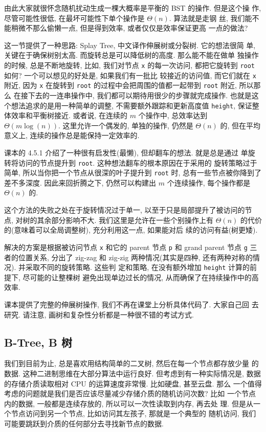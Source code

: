 \documentclass[a4paper]{ctexart}
\theoremstyle{definition}
\theoremstyle{definition}
\begin{document}
由此大家就很怀念随机扰动生成一棵大概率是平衡的 BST 的操作. 但是这个操
作, 尽管可能性很低, 在最坏可能性下单个操作是 $\Theta(n)$. 算法就是走钢
丝, 我们能不能稍微不那么偷懒一点, 但是得到效率, 或者仅仅是效率保证更高
一点的做法?

这一节提供了一种思路: Splay Tree, 中文译作伸展树或分裂树. 它的想法很简
单, 关键在于确保树别太高. 而旋转总是可以降低树的高度. 那么能不能在做单
独操作的时候, 总是不断地旋转, 比如, 我们对节点 \verb|x| 的每一次访问,
都把它旋转到 \verb|root| 如何? 一个可以想见的好处是, 如果我们有一批比
较接近的访问值, 而它们就在 \verb|x| 附近, 因为 \verb|x| 在旋转到
\verb|root| 的过程中会把周围的值都一起带到 \verb|root| 附近, 所以那么
在接下去的一连串操作中, 我们都可以期待用很少的步骤就完成操作. 也就是这
个想法追求的是用一种简单的调整, 不需要额外跟踪和更新高度值
\verb|height|, 保证整体效率和平衡树接近. 或者说, 在连续的 $m$ 个操作中,
总效率达到 $\Theta(m \log(n))$. 这里允许一个偶发的, 单独的操作, 仍然是
$\Theta(n)$ 的, 但在平均意义上, 连续的操作总是能保持一定效率的.

课本的 4.5.1 介绍了一种很有启发性(最懒), 但却翻车的想法. 就是总是通过
单旋转将访问的节点提升到 \verb|root|. 这种想法翻车的根本原因在于采用的
旋转策略过于简单, 所以当你把一个节点从很深的叶子提升到 \verb|root| 时,
总有一些节点被你降到了差不多深度. 因此来回折腾之下, 仍然可以构建出 $m$
个连续操作, 每个操作都是 $\Theta(n)$ 的.

这个方法的失败之处在于旋转情况过于单一, 以至于只是局部提升了被访问的节
点, 对树的其余部分影响不大. 我们这里是允许在一些个别操作上有
$\Theta(n)$ 的代价的(意味着可以全局调整树), 充分利用这一点, 如果能对后
续的访问有益(树更矮).

解决的方案是根据被访问节点 \verb|x| 和它的 parent 节点 \verb|p| 和
grand parent 节点 \verb|g| 三者的位置关系, 分出了 zig-zag 和 zig-zig
两种情况(其实是四种, 还有两种对称的情况). 并采取不同的旋转策略. 这些判
定和策略, 在没有额外增加 \verb|height| 计算的前提下, 尽可能的让整棵树
避免出现单边过长的情况, 从而确保了在持续操作中的高效率.

课本提供了完整的伸展树操作, 我们不再在课堂上分析具体代码了. 大家自己回
去研究. 请注意, 画树和复杂性分析都是一种很不错的考试方式.

\subsection{B-Tree, B 树}
我们到目前为止, 总是喜欢用结构简单的二叉树, 然后在每一个节点都存放少量
的数据. 这种二进制思维在大部分算法中运行良好. 但考虑到有一种实际情况是,
数据的存储介质读取相对 CPU 的运算速度非常慢. 比如硬盘, 甚至云盘. 那么
一个值得考虑的问题就是我们是否应该尽量减少存储介质的随机访问次数? 比如
一个节点内的数据, 一般都是连续存放的, 所以可以一次性读取到内存, 再去处
理. 但是从一个节点访问到另一个节点, 比如访问其左孩子, 那就是一个典型的
随机访问, 我们可能要跳跃到介质的任何部分去寻找新节点的数据.
\end{document}
